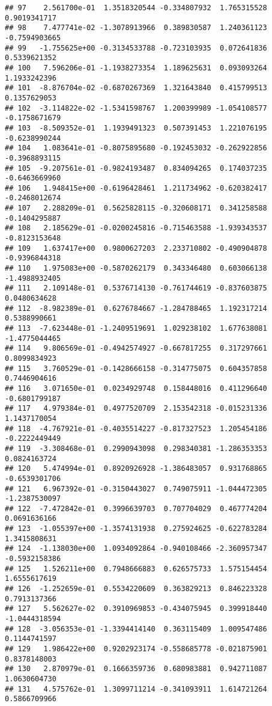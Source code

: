 \documentclass[
]{article}
\begin{document}
\begin{verbatim}
## 97    2.561700e-01  1.3518320544 -0.334807932  1.765315528  0.9019341717
## 98    7.477741e-02 -1.3078913966  0.389830587  1.240361123 -0.7594903665
## 99   -1.755625e+00 -0.3134533788 -0.723103935  0.072641836  0.5339621352
## 100   7.596206e-01 -1.1938273354  1.189625631  0.093093264  1.1933242396
## 101  -8.876704e-02 -0.6870267369  1.321643840  0.415799513  0.1357629053
## 102  -3.114822e-02 -1.5341598767  1.200399989 -1.054108577 -0.1758671679
## 103  -8.509352e-01  1.1939491323  0.507391453  1.221076195 -0.6238990244
## 104   1.083641e-01 -0.8075895680 -0.192453032 -0.262922856 -0.3968893115
## 105  -9.207561e-01 -0.9824193487  0.834094265  0.174037235 -0.6463669960
## 106   1.948415e+00 -0.6196428461  1.211734962 -0.620382417 -0.2468012674
## 107   2.288209e-01  0.5625828115 -0.320608171  0.341258588 -0.1404295887
## 108   2.185629e-01 -0.0200245816 -0.715463588 -1.939343537 -0.8123153648
## 109   1.637417e+00  0.9800627203  2.233710802 -0.490904878 -0.9396844318
## 110   1.975083e+00 -0.5870262179  0.343346480  0.603066138 -1.4988932405
## 111   2.109148e-01  0.5376714130 -0.761744619 -0.837603875  0.0480634628
## 112  -8.982389e-01  0.6276784667 -1.284788465  1.192317214  0.5388990661
## 113  -7.623448e-01 -1.2409519691  1.029238102  1.677638081 -1.4775044465
## 114   9.806569e-01 -0.4942574927 -0.667817255  0.317297661  0.8099834923
## 115   3.760529e-01 -0.1428666158 -0.314775075  0.604357858  0.7446904616
## 116   3.071650e-01  0.0234929748  0.158448016  0.411296640 -0.6801799187
## 117   4.979384e-01  0.4977520709  2.153542318 -0.015231336  1.1437170054
## 118  -4.767921e-01 -0.4035514227 -0.817327523  1.205454186 -0.2222449449
## 119  -3.308468e-01  0.2990943098  0.298340381 -1.286353353  0.0824163724
## 120   5.474994e-01  0.8920926928 -1.386483057  0.931768865 -0.6539301706
## 121   6.967392e-01 -0.3150443027  0.749075911 -1.044472305 -1.2387530097
## 122  -7.472842e-01  0.3996639703  0.707704029  0.467774204  0.0691636166
## 123  -1.055397e+00 -1.3574131938  0.275924625 -0.622783284  1.3415808631
## 124  -1.138030e+00  1.0934092864 -0.940108466 -2.360957347 -0.5932158386
## 125   1.526211e+00  0.7948666883  0.626575733  1.575154454  1.6555617619
## 126  -1.252659e-01  0.5534220609  0.363829213  0.846223328  0.7913137366
## 127   5.562627e-02  0.3910969853 -0.434075945  0.399918440 -1.0444318594
## 128  -3.056353e-01 -1.3394414140  0.363115409  1.009547486  0.1144741597
## 129   1.986422e+00  0.9202923174 -0.558685778 -0.021875901  0.8378148003
## 130   2.870979e-01  0.1666359736  0.680983881  0.942711087  1.0630604730
## 131   4.575762e-01  1.3099711214 -0.341093911  1.614721264  0.5866709966

\end{verbatim}
\end{document}
